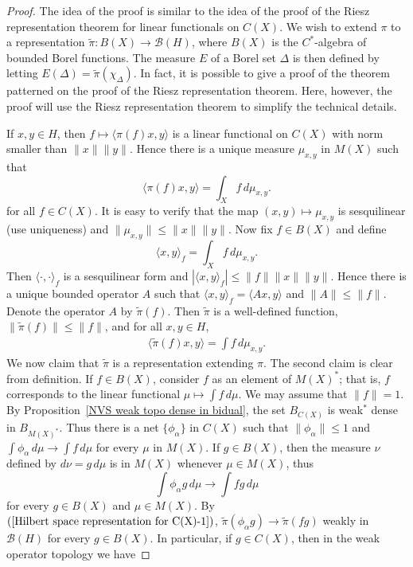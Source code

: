 \begin{proof}
The idea of the proof is similar to the idea of the proof of the Riesz representation theorem for linear functionals on $C(X)$. We wish to extend $\pi$ to a representation $\widetilde{\pi}:B(X)\to\mathcal{B}(H)$, where $B(X)$ is the $C^*$-algebra of bounded Borel functions. The measure $E$ of a Borel set $\Delta$ is then defined by letting $E(\Delta)=\widetilde{\pi}(\chi_\Delta)$. In fact, it is possible to give a proof of the theorem patterned on the proof of the Riesz representation theorem. Here, however, the proof will use the Riesz representation theorem to simplify the technical details.\par
If $x,y\in H$, then $f\mapsto\langle\pi(f)x,y\rangle$ is a linear functional on $C(X)$ with norm smaller than $\|x\|\|y\|$. Hence there is a unique measure $\mu_{x,y}$ in $M(X)$ such that
\[\langle\pi(f)x,y\rangle=\int_Xf\,d\mu_{x,y}.\]
for all $f\in C(X)$. It is easy to verify that the map $(x,y)\mapsto\mu_{x,y}$ is sesquilinear (use uniqueness) and $\|\mu_{x,y}\|\leq\|x\|\|y\|$. Now fix $f\in B(X)$ and define
\[\langle x,y\rangle_f=\int_Xf\,d\mu_{x,y}.\]
Then $\langle\cdot,\cdot\rangle_f$ is a sesquilinear form and $|\langle x,y\rangle_f|\leq\|f\|\|x\|\|y\|$. Hence there is a unique bounded operator $A$ such that $\langle x,y\rangle_f=\langle Ax,y\rangle$ and $\|A\|\leq\|f\|$. Denote the operator $A$ by $\widetilde{\pi}(f)$. Then $\widetilde{\pi}$ is a well-defined function, $\|\widetilde{\pi}(f)\|\leq\|f\|$, and for all $x,y\in H$,
\begin{align}\label{Hilbert space representation for C(X)-1}
\langle\widetilde{\pi}(f)x,y\rangle=\int f\,d\mu_{x,y}.
\end{align}
We now claim that $\widetilde{\pi}$ is a representation extending $\pi$. The second claim is clear from definition. If $f\in B(X)$, consider $f$ as an element of $M(X)^*$; that is, $f$ corresponds to the linear functional $\mu\mapsto\int f\,d\mu$. We may assume that $\|f\|=1$. By Proposition~\ref{NVS weak topo dense in bidual}, the set $B_{C(X)}$ is weak$^*$ dense in $B_{M(X)^*}$. Thus there is a net $\{\phi_\alpha\}$ in $C(X)$ such that $\|\phi_\alpha\|\leq 1$ and $\int\phi_\alpha\,d\mu\to\int f\,d\mu$ for every $\mu$ in $M(X)$. If $g\in B(X)$, then the measure $\nu$ defined by $d\nu=g\,d\mu$ is in $M(X)$ whenever $\mu\in M(X)$, thus
\[\int\phi_\alpha g\,d\mu\to\int fg\,d\mu\]
for every $g\in B(X)$ and $\mu\in M(X)$. By $(\ref{Hilbert space representation for C(X)-1})$, $\widetilde{\pi}(\phi_\alpha g)\to\widetilde{\pi}(fg)$ weakly in $\mathcal{B}(H)$ for every $g\in B(X)$. In particular, if $g\in C(X)$, then in the weak operator topology we have

\end{proof}

